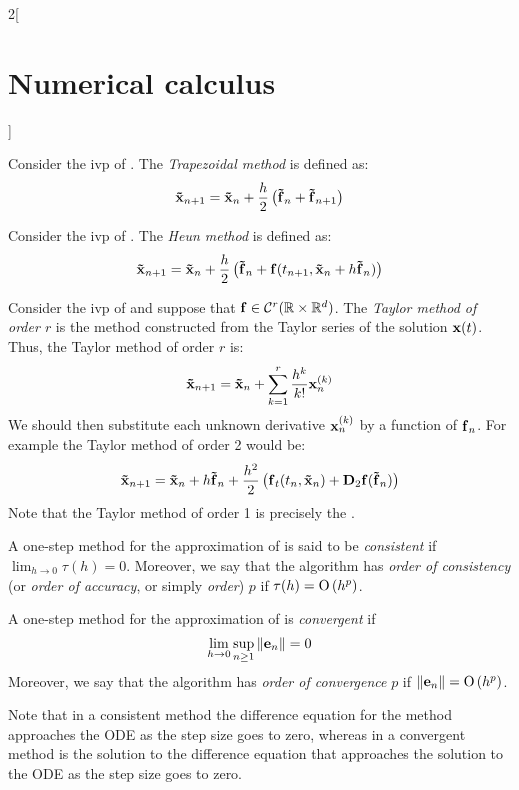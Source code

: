 \documentclass[../../../main_math.tex]{subfiles}
\begin{document}
\begin{multicols}{2}[\section{Numerical calculus}]
\begin{figure}[H]
    \label{NC:euler_fig}
  \end{figure}
  \begin{definition}
    Consider the ivp of . The \emph{Trapezoidal method} is defined as:
    $$\boldsymbol{\mathrm{\tilde{x}}}_{n+1}=\boldsymbol{\mathrm{\tilde{x}}}_{n}+\frac{h}{2}\left(\boldsymbol{\mathrm{\tilde{f}}}_n+\boldsymbol{\mathrm{\tilde{f}}}_{n+1}\right)$$
  \end{definition}
  \begin{definition}
    Consider the ivp of . The \emph{Heun method} is defined as:
    $$\boldsymbol{\mathrm{\tilde{x}}}_{n+1}=\boldsymbol{\mathrm{\tilde{x}}}_{n}+\frac{h}{2}\left(\boldsymbol{\mathrm{\tilde{f}}}_n+\boldsymbol{\mathrm{f}}(t_{n+1},\boldsymbol{\mathrm{\tilde{x}}}_{n}+h\boldsymbol{\mathrm{\tilde{f}}}_n)\right)$$
  \end{definition}
  \begin{definition}
    Consider the ivp of  and suppose that $\boldsymbol{\mathrm{f}}\in\mathcal{C}^r(\mathbb{R}\times\mathbb{R}^d)$. The \emph{Taylor method of order $r$} is the method constructed from the Taylor series of the solution $\boldsymbol{\mathrm{x}}(t)$. Thus, the Taylor method of order $r$ is:
    $$\boldsymbol{\mathrm{\tilde{x}}}_{n+1}=\boldsymbol{\mathrm{\tilde{x}}}_{n}+\sum_{k=1}^r\frac{h^k}{k!}\boldsymbol{\mathrm{x}}_n^{(k)}$$
    We should then substitute each unknown derivative $\boldsymbol{\mathrm{x}}_n^{(k)}$ by a function of $\boldsymbol{\mathrm{f}}_n$.
    For example the Taylor method of order 2 would be:
    $$\boldsymbol{\mathrm{\tilde{x}}}_{n+1}=\boldsymbol{\mathrm{\tilde{x}}}_{n}+h\boldsymbol{\mathrm{\tilde{f}}}_n+\frac{h^2}{2}\left(\boldsymbol{\mathrm{{f}}}_t(t_n,\boldsymbol{\mathrm{\tilde{x}}}_{n})+\boldsymbol{\mathrm{D}}_2\boldsymbol{\mathrm{f}}(\boldsymbol{\mathrm{\tilde{f}}}_n)\right)$$
    Note that the Taylor method of order 1 is precisely the .
  \end{definition}
  \begin{definition}
    A one-step method for the approximation of  is said to be \emph{consistent} if $\displaystyle\lim_{h\to 0}\tau(h)=0$. Moreover, we say that the algorithm has \emph{order of consistency} (or \emph{order of accuracy}, or simply \emph{order}) $p$ if $\tau(h)=\mathrm{O}\left(h^p\right)$.
  \end{definition}
  \begin{definition}
    A one-step method for the approximation of  is \emph{convergent} if $$\lim_{h\to 0}\sup_{n\geq 1}\left\|\boldsymbol{\mathrm{e}}_n\right\|=0$$
    Moreover, we say that the algorithm has \emph{order of convergence} $p$ if $\left\|\boldsymbol{\mathrm{e}}_n\right\|=\mathrm{O}\left(h^p\right)$.
  \end{definition}
  \begin{remark}
    Note that in a consistent method the difference equation for the method approaches the ODE as the step size goes to zero, whereas in a convergent method is the solution to the difference equation that approaches the solution to the ODE as the step size goes to zero.

\end{remark}
\end{multicols}
\end{document}
